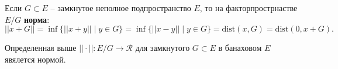 \begin{to_def}
	Если $G \subset E$ -- замкнутое неполное подпространство $E$, то на факторпрострнастве $E/G$ \textbf{норма}:
	\begin{equation*}
		||x+G|| = \inf \{||x+y|| \mid y \in G\} = \inf \{||x-y|| \mid y \in G\} = \text{dist}(x,G) = \text{dist}(0,x+G).
	\end{equation*}
\end{to_def}
\begin{to_lem}
	Определенная выше $||\cdot|| \colon E/G \to \mathcal{R}$ для замкнутого $G \subset E$ в банаховом $E$ явялется нормой.
\end{to_lem}